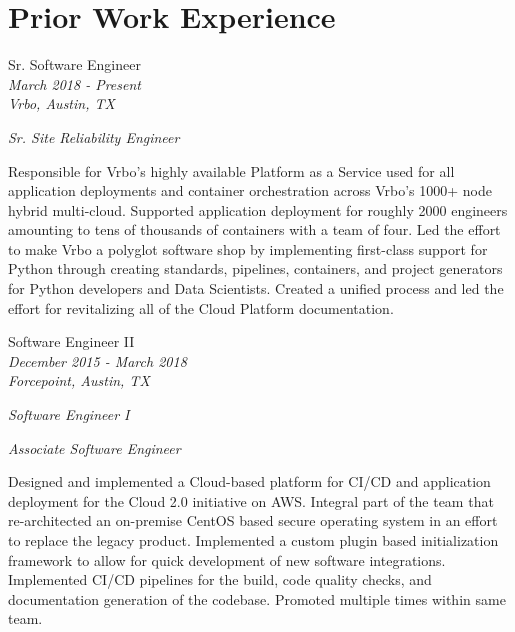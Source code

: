 \documentclass[10pt]{article} %
\begin{document}
\begin{minipage}[t]{0.5\textwidth} %
\vspace{0pt} %
\section{Prior Work Experience} 


{\raggedright\large Sr. Software Engineer\\
\small \textit{March 2018 - Present}\\
\small \textit{Vrbo, Austin, TX} \\
\raggedright\small \textit{Sr. Site Reliability Engineer}\\[5pt]}

\normalsize{Responsible for Vrbo's highly available Platform as a Service used for all application deployments and container orchestration across Vrbo's 1000+ node hybrid multi-cloud. Supported application deployment for roughly 2000 engineers amounting to tens of thousands of containers with a team of four. Led the effort to make Vrbo a polyglot software shop by implementing first-class support for Python through creating standards, pipelines, containers, and project generators for Python developers and Data Scientists. Created a unified process and led the effort for revitalizing all of the Cloud Platform documentation. }\\

{
\raggedright\large  Software Engineer II\\
\small \textit{December 2015 - March 2018}\\
\small \textit{Forcepoint, Austin, TX}\\
\raggedright\small \textit{Software Engineer I}\\
\raggedright\small \textit{Associate Software Engineer}\\
[5pt]
}

\normalsize{Designed and implemented a Cloud-based platform for CI/CD and application deployment for the Cloud 2.0 initiative on AWS. Integral part of the team that re-architected an on-premise CentOS based secure operating system in an effort to replace the legacy product. Implemented a custom plugin based initialization framework to allow for quick development of new software integrations. Implemented CI/CD pipelines for the build, code quality checks, and documentation generation of the codebase. Promoted multiple times within same team.}\\


\end{minipage}
\end{document}
